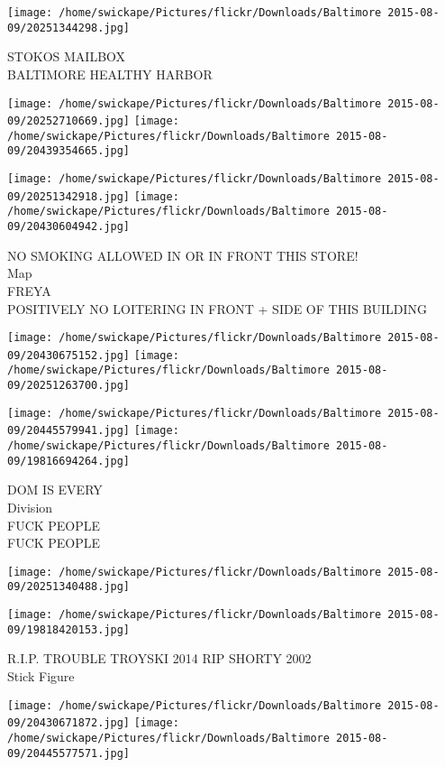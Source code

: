 \documentclass[10pt,letterpaper]{article}
\begin{document}
\vspace{0.25in}
\texttt{[image: /home/swickape/Pictures/flickr/Downloads/Baltimore 2015-08-09/20251344298.jpg]}

STOKOS MAILBOX\\
BALTIMORE HEALTHY HARBOR
\pagebreak

\texttt{[image: /home/swickape/Pictures/flickr/Downloads/Baltimore 2015-08-09/20252710669.jpg]}
\texttt{[image: /home/swickape/Pictures/flickr/Downloads/Baltimore 2015-08-09/20439354665.jpg]}

\texttt{[image: /home/swickape/Pictures/flickr/Downloads/Baltimore 2015-08-09/20251342918.jpg]}
\texttt{[image: /home/swickape/Pictures/flickr/Downloads/Baltimore 2015-08-09/20430604942.jpg]}

NO SMOKING ALLOWED IN OR IN FRONT THIS STORE!\\
Map\\
FREYA\\
POSITIVELY NO LOITERING IN FRONT + SIDE OF THIS BUILDING
\pagebreak

\texttt{[image: /home/swickape/Pictures/flickr/Downloads/Baltimore 2015-08-09/20430675152.jpg]}
\texttt{[image: /home/swickape/Pictures/flickr/Downloads/Baltimore 2015-08-09/20251263700.jpg]}

\texttt{[image: /home/swickape/Pictures/flickr/Downloads/Baltimore 2015-08-09/20445579941.jpg]}
\texttt{[image: /home/swickape/Pictures/flickr/Downloads/Baltimore 2015-08-09/19816694264.jpg]}

DOM IS EVERY\\
Division\\
FUCK PEOPLE\\
FUCK PEOPLE
\pagebreak

\texttt{[image: /home/swickape/Pictures/flickr/Downloads/Baltimore 2015-08-09/20251340488.jpg]}

\vspace{0.25in}
\texttt{[image: /home/swickape/Pictures/flickr/Downloads/Baltimore 2015-08-09/19818420153.jpg]}

R.I.P. TROUBLE TROYSKI 2014 RIP SHORTY 2002\\
Stick Figure
\pagebreak

\texttt{[image: /home/swickape/Pictures/flickr/Downloads/Baltimore 2015-08-09/20430671872.jpg]}
\texttt{[image: /home/swickape/Pictures/flickr/Downloads/Baltimore 2015-08-09/20445577571.jpg]}
\end{document}

